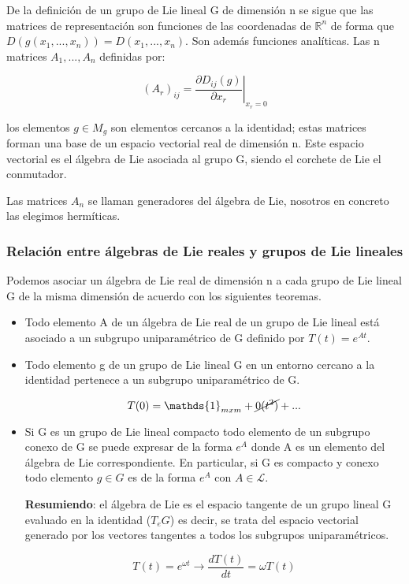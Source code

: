 \documentclass{article}
\begin{document}
De la definición de un grupo de Lie lineal G de dimensión n se sigue que las matrices de representación son funciones de las coordenadas de $\mathds{R}^n$ de forma que $D(g(x_1,...,x_n))=D(x_1,...,x_n)$. Son además funciones analíticas. Las n matrices $A_1,..., A_n$ definidas por:

$$\left . (A_r)_{ij}=\frac{\partial D_{ij}(g)}{\partial x_r} \right |_{x_r=0}$$

los elementos $g\in M_g$ son elementos cercanos a la identidad; estas matrices forman una base de un espacio vectorial real de dimensión n. Este espacio vectorial es el álgebra de Lie asociada al grupo G, siendo el corchete de Lie el conmutador.

Las matrices $A_n$ se llaman generadores del álgebra de Lie, nosotros en concreto las elegimos hermíticas.


\subsubsection{Relación entre álgebras de Lie reales y grupos de Lie lineales}

Podemos asociar un álgebra de Lie real de dimensión n a cada grupo de Lie lineal G de la misma dimensión de acuerdo con los siguientes teoremas.

\begin{itemize}
\item Todo elemento A de un álgebra de Lie real de un grupo de Lie lineal está asociado a un subgrupo uniparamétrico de G definido por $T(t)=e^{At}$.

\item Todo elemento g de un grupo de Lie lineal G en un entorno cercano a la identidad pertenece a un subgrupo uniparamétrico de G.

$$T(0)=\mathds{1}_{mxm}+\cancel{0(t^2)}+...$$

\item Si G es un grupo de Lie lineal compacto todo elemento de un subgrupo conexo de G se puede expresar de la forma $e^A$ donde A es un elemento del álgebra de Lie correspondiente. En particular, si G es compacto y conexo todo elemento $g\in G$ es de la forma $e^A$ con $A\in  \mathcal{L}$.

\textbf{Resumiendo}: el álgebra de Lie es el espacio tangente de un grupo lineal G evaluado en la identidad ($T_eG$) es decir, se trata del espacio vectorial generado por los vectores tangentes a todos los subgrupos uniparamétricos.

$$T(t)=e^{\omega t} \longrightarrow \frac{dT(t)}{dt}=\omega T(t)$$

\end{itemize}
\end{document}
